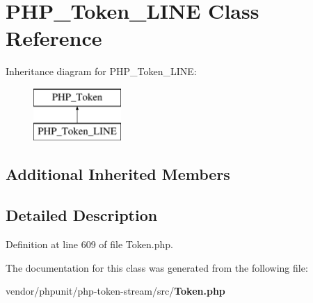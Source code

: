 \section{P\+H\+P\+\_\+\+Token\+\_\+\+L\+I\+N\+E Class Reference}
\label{class_p_h_p___token___l_i_n_e}
Inheritance diagram for P\+H\+P\+\_\+\+Token\+\_\+\+L\+I\+N\+E\+:\begin{figure}[H]
\begin{center}
\leavevmode
\includegraphics[height=2.000000cm]{class_p_h_p___token___l_i_n_e}
\end{center}
\end{figure}
\subsection*{Additional Inherited Members}


\subsection{Detailed Description}


Definition at line 609 of file Token.\+php.



The documentation for this class was generated from the following file\+:\begin{DoxyCompactItemize}
\item 
vendor/phpunit/php-\/token-\/stream/src/{\bf Token.\+php}\end{DoxyCompactItemize}
